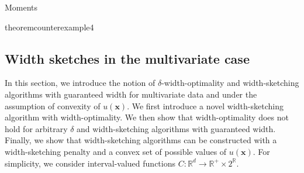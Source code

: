 \begin{assumptioni}[i.i.d data]
\begin{assumptioni}
\begin{assumptioni}{Moments}
\begin{restatable}{theorem}{counterexample4}
\subsection{Width sketches in the multivariate case}  \label{sec:convex}
In this section, we introduce the notion of $\delta$-width-optimality and width-sketching algorithms with guaranteed width for multivariate data and under the assumption of convexity of $u(\bm{x})$. 
We first introduce a novel width-sketching algorithm with width-optimality. 
We then show that width-optimality does not hold for arbitrary $\delta$ and width-sketching algorithms with guaranteed width.
Finally, we show that width-sketching algorithms can be constructed with a width-sketching penalty and a convex set of possible values of $u(\bm{x})$. 
For simplicity, we consider interval-valued functions $C: \mathbb{R}^d \rightarrow \mathbb{R}^+ \times 2^{\mathbb{R}}$.

\end{restatable}
\end{assumptioni}
\end{assumptioni}
\end{assumptioni}
